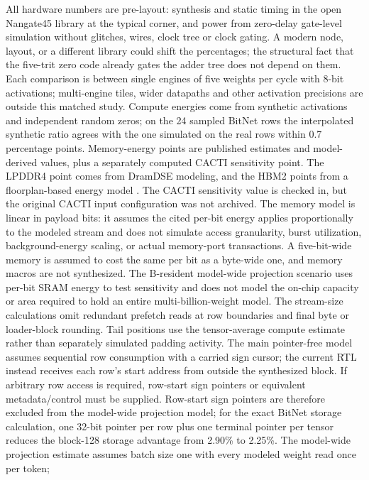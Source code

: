 \documentclass[11pt]{article}
\begin{document}
All hardware numbers are pre-layout: synthesis and static timing in the
open Nangate45 library at the typical corner, and power from zero-delay
gate-level simulation without glitches, wires, clock tree or clock gating.
A modern node, layout, or a different library could shift the percentages;
the structural fact that the five-trit zero code already gates the adder
tree does not depend on them. Each comparison is between single engines of
five weights per cycle with 8-bit activations; multi-engine tiles, wider
datapaths and other activation precisions are outside this matched study. Compute energies
come from synthetic activations and independent random zeros; on the 24
sampled BitNet rows the interpolated synthetic ratio agrees with the one
simulated on the real rows within 0.7 percentage points. Memory-energy points are published estimates and model-derived values, plus a separately computed CACTI sensitivity point. The LPDDR4 point comes from DramDSE modeling, and the HBM2 points from a floorplan-based energy model \cite{ha2018dram,oconnor2017fgdram}. The CACTI sensitivity value is checked in, but the original CACTI input configuration was not archived.
The memory model is linear in payload bits: it assumes the cited per-bit energy applies proportionally to the modeled stream and does not simulate access granularity, burst utilization, background-energy scaling, or actual memory-port transactions. A five-bit-wide memory is assumed to cost the same per bit as a byte-wide
one, and memory macros are not synthesized. The B-resident model-wide projection
scenario uses per-bit SRAM energy to test sensitivity and does not model the
on-chip capacity or area required to hold an entire multi-billion-weight
model. The stream-size calculations omit redundant prefetch reads at row boundaries and final byte or loader-block rounding. Tail positions use the tensor-average compute estimate rather than separately simulated padding activity. The main pointer-free model assumes sequential row consumption with a carried sign cursor; the current RTL instead receives each row's start address from outside the synthesized block. If arbitrary row access is required, row-start sign pointers or equivalent metadata/control must be supplied. Row-start sign pointers are therefore excluded from the model-wide projection model;
for the exact BitNet storage calculation, one 32-bit pointer per row plus one terminal pointer per tensor reduces
the block-128 storage advantage from 2.90\% to 2.25\%. The model-wide projection
estimate assumes batch size one with every modeled weight read once per token;
\end{document}
